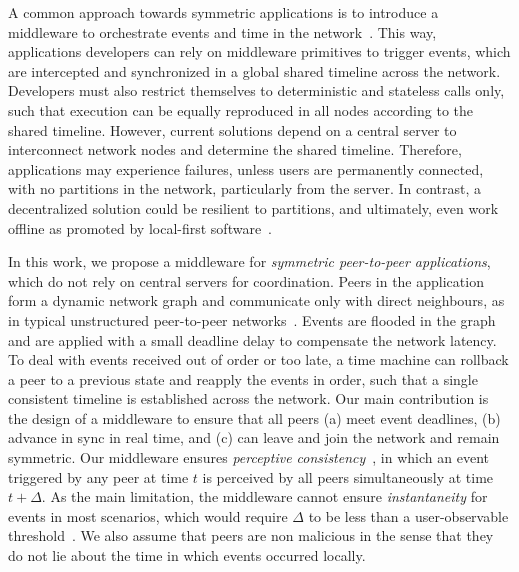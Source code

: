 \documentclass[10pt,journal,compsoc]{IEEEtran}
\begin{document}
A common approach towards symmetric applications is to introduce a middleware
to orchestrate events and time in the network~\cite{gals,croquet2}.
This way, applications developers can rely on middleware primitives to trigger
events, which are intercepted and synchronized in a global shared timeline
across the network.
Developers must also restrict themselves to deterministic and stateless calls
only, such that execution can be equally reproduced in all nodes according to
the shared timeline. %
However, current solutions depend on a central server to interconnect network
nodes and determine the shared timeline.
Therefore, applications may experience failures, unless users are permanently
connected, with no partitions in the network, particularly from the server.
In contrast, a decentralized solution could be resilient to partitions, and
ultimately, even work offline as promoted by local-first software~\cite{local}.

In this work, we propose a middleware for \emph{symmetric peer-to-peer
applications}, which do not rely on central servers for coordination.
Peers in the application form a dynamic network graph and communicate only
with direct neighbours, as in typical unstructured peer-to-peer
networks~\cite{p2p.survey}.
%
Events are flooded in the graph and are applied with a small deadline delay to
compensate the network latency.
To deal with events received out of order or too late, a time machine can
rollback a peer to a previous state and reapply the events in order, such that
a single consistent timeline is established across the network.
%
Our main contribution is the design of a middleware to ensure that all peers
    (a) meet event deadlines,
    (b) advance in sync in real time, and
    (c) can leave and join the network and remain symmetric.
%
Our middleware ensures \emph{perceptive consistency}~\cite{melding}, in which
an event triggered by any peer at time $t$ is perceived by all peers
simultaneously at time $t+\Delta$.
%
As the main limitation, the middleware cannot ensure \emph{instantaneity} for
events in most scenarios, which would require $\Delta$ to be less than a
user-observable threshold~\cite{melding}.
We also assume that peers are non malicious in the sense that they do not lie
about the time in which events occurred locally.
\end{document}
